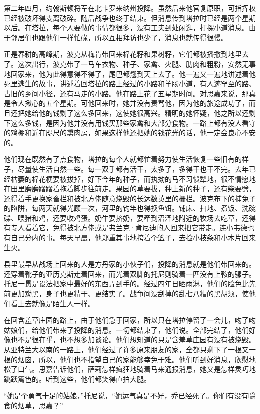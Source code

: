 \par 第二年四月，约翰斯顿将军在北卡罗来纳州投降。虽然后来他官复原职，可指挥权已经被破坏得支离破碎。随后战争也终于结束。但消息传到塔拉时已经是两个星期以后。在塔拉，每个人要做的事情都很多，没有工夫到处闲逛，打探小道消息。由于邻居们也跟他们一样忙碌，所以互相拜访也少了，消息也就传得很慢。
\par 正是春耕的高峰期，波克从梅肯带回来棉花籽和果树籽，它们都被播撒到地里去了。这次出行，波克带了一马车衣物、种子、家禽、火腿、肋肉和粗粉，安然无事地回家来，他为此得意得不得了，尾巴都翘到天上去了。他一遍又一遍地讲述着他死里逃生的故事，讲述着回塔拉的路上经过的小路和羊肠小道，有人迹罕至的路、古旧的乡间小径，还有马走的小路。他在路上花了五星期时间。对思嘉来说，那真是令人揪心的五个星期。可他回来时，她并没有责骂他，因为他的旅途成功了，而且还把她给他的钱剩了这么多回来，这使她很高兴。精明的她怀疑，他之所以还剩下这么多钱，是因为他并没有用钱买那些家禽和大部分食物。一路上都有没人看守的鸡棚和近在咫尺的熏肉房，如果这样他还把她的钱花光的话，他一定会良心不安的。
\par 他们现在既然有了点食物，塔拉的每个人就都忙着努力使生活恢复一些旧有的样子，尽量使生活自然一些。每一双手都有活干，太多了，多得干也干不完。去年已经枯萎的棉花梗要被拔掉，好下今年的种子，而执拗的马不习惯犁地，很不情愿地在田里磨磨蹭蹭着拖着脚步往前走。果园的草要拔，种上新的种子，还有柴要劈，还得着手更换家畜栏和被北方佬随意烧毁的长达数英里的栅栏。波克布下的捕兔子的陷阱，每两天就得光顾一次，河里的钓竿也得换鱼饵。铺床、扫地、煮饭、洗碗碟、喂猪和鸡，还要收鸡蛋。奶牛要挤奶，要牵到沼泽地附近的牧场去吃草，还得有专人看着它，免得被北方佬或是弗兰克·肯尼迪的人回来把它带走。连小韦德也有自己分内的事。每天早晨，他郑重其事地挎着个篮子，去捡小枝条和小木片回来生火。
\par 县里最早从战场上回来的人是方丹家的小伙子们，投降的消息就是他们带回来的。还穿着靴子的亚历克斯走着回来，而光着双脚的托尼则骑着一匹没有上鞍的骡子。托尼一贯是设法把家中最好的东西弄到手的。经过四年日晒雨淋，他们的脸色比先前更加黝黑，身子也更精干、更结实了。战争间没刮掉的乱七八糟的黑胡须，使他们看上去就像是陌生人一样。
\par 在回含羞草庄园的路上，由于他们急于回家，所以只在塔拉停留了一会儿，吻了吻姑娘们，给他们带来了投降的消息。一切都结束了，他们说。全部完结了，他们好像也不是很在乎，也不想多加谈论。他们想知道的只是含羞草庄园有没有被烧毁。从亚特兰大以南的一路上，他们经过了许多原来朋友的家，全都只剩下了一根又一根的烟囱，所以，他们也不指望自己的家能够幸免于难。他们听到好消息，欣慰地松了口气。思嘉告诉他们，萨莉怎样疯狂地骑着马来通报消息，她又是怎样灵巧地跳跃篱笆的。听到这些，他们都笑得直拍大腿。
\par “她是个勇气十足的姑娘，”托尼说，“她运气真是不好，乔已经死了。你们有没有嚼食的烟草，思嘉？”
